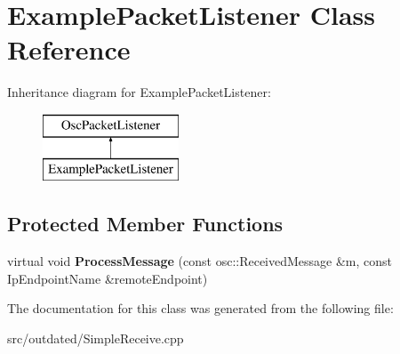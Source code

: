 \hypertarget{classExamplePacketListener}{\section{Example\-Packet\-Listener Class Reference}
\label{classExamplePacketListener}
}
Inheritance diagram for Example\-Packet\-Listener\-:\begin{figure}[H]
\begin{center}
\leavevmode
\includegraphics[height=2.000000cm]{classExamplePacketListener}
\end{center}
\end{figure}
\subsection*{Protected Member Functions}
\begin{DoxyCompactItemize}
\item 
\hypertarget{classExamplePacketListener_a688ed2a3ec01d0fb7661f4fe0ffc90df}{virtual void {\bfseries Process\-Message} (const osc\-::\-Received\-Message \&m, const Ip\-Endpoint\-Name \&remote\-Endpoint)}\label{classExamplePacketListener_a688ed2a3ec01d0fb7661f4fe0ffc90df}

\end{DoxyCompactItemize}


The documentation for this class was generated from the following file\-:\begin{DoxyCompactItemize}
\item 
src/outdated/Simple\-Receive.\-cpp\end{DoxyCompactItemize}
